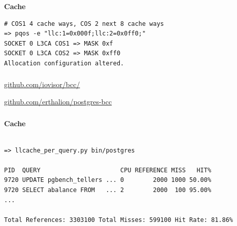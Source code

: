 \documentclass[usenames,dvipsnames, 18pt, compress, aspectratio=169]{beamer}
\begin{document}
\begin{frame}[fragile]{}
    \frametitle{}
    \begin{center}
        \textbf{Cache}

        \begin{flushleft}
		\begin{verbatim}
# COS1 4 cache ways, COS 2 next 8 cache ways
=> pqos -e "llc:1=0x000f;llc:2=0x0ff0;"
SOCKET 0 L3CA COS1 => MASK 0xf
SOCKET 0 L3CA COS2 => MASK 0xff0
Allocation configuration altered.
        \end{verbatim}
        \end{flushleft}

    \end{center}
\end{frame}

\begin{frame}
    \frametitle{}
    \begin{center}

        \begin{flushleft}
        \href{https://github.com/iovisor/bcc/}
             {\color{black}\LARGE{github.com/iovisor/bcc/}}

        \href{https://github.com/erthalion/postgres-bcc}
             {\color{black}\LARGE{github.com/erthalion/postgres-bcc}}
        \end{flushleft}

    \end{center}
\end{frame}

\begin{frame}[fragile]{}
    \frametitle{}
    \begin{center}
        \textbf{Cache}

        \begin{flushleft}
		\begin{verbatim}

=> llcache_per_query.py bin/postgres

PID  QUERY                      CPU REFERENCE MISS   HIT%
9720 UPDATE pgbench_tellers ... 0        2000 1000 50.00%
9720 SELECT abalance FROM   ... 2        2000  100 95.00%
...

Total References: 3303100 Total Misses: 599100 Hit Rate: 81.86%
        \end{verbatim}
        \end{flushleft}

    \end{center}
\end{frame}
\end{document}
